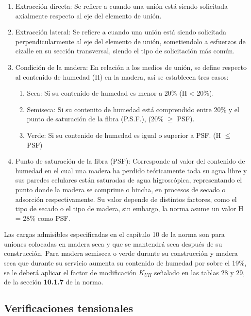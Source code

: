 \begin{enumerate}
		\item Extracción directa: Se refiere a cuando una unión está siendo solicitada axialmente respecto al eje del elemento de unión. 
		\item Extracción lateral: Se refiere a cuando una unión está siendo solicitada perpendicularmente al eje del elemento de unión, sometiendolo a esfuerzos de cizalle en su sección transversal, siendo el tipo de solicitación más común.
		\item Condición de la madera: En relación a los medios de unión, se define respecto al contenido de humedad (H) en la madera, así se establecen tres casos:
		\begin{enumerate}
			\item Seca: Si su contenido de humedad es menor a 20\% (H < 20\%).
			\item Semiseca: Si su contenito de humedad está comprendido entre 20\% y el punto de saturación de la fibra (P.S.F.), (20\% $\geq$  PSF).
			\item Verde: Si su contenido de humedad es igual o superior a PSF. (H $\leq$ PSF)
		\end{enumerate}
		\item Punto de saturación de la fibra (PSF): Corresponde al valor del contenido de humedad en el cual una madera ha perdido teóricamente toda su agua libre y sus paredes celulares están saturadas de agua higroscópica, representando el punto donde la madera se comprime o hincha, en procesos de secado o adsorción respectivamente. Su valor depende de distintos factores, como el tipo de secado o el tipo de madera, sin embargo, la norma asume un valor H = 28\% como PSF.
\end{enumerate}

Las cargas admisibles especificadas en el capítulo 10 de la norma son para uniones colocadas en madera seca y que se mantendrá seca después de su construcción. Para madera semiseca o verde durante su construcción y madera seca que durante su servicio aumenta su contenido de humedad por sobre el 19\%, se le deberá aplicar el factor de modificación $K_{UH}$ señalado en las tablas 28 y 29, de la sección \textbf{10.1.7} de la norma.

\subsection{Verificaciones tensionales}

